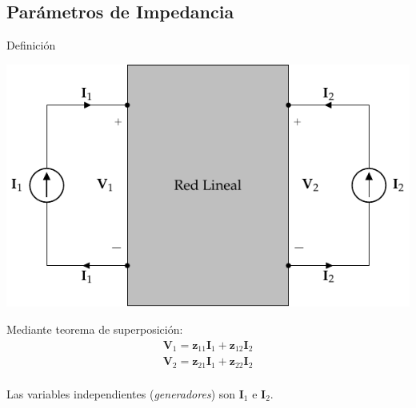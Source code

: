 \documentclass[xcolor={usenames,svgnames,dvipsnames}]{beamer}
\begin{document}
\subsection{Parámetros de Impedancia}
\label{sec:org39850c0}

\begin{frame}[label={sec:org4a5c1ec}]{Definición}
\begin{center}
\includegraphics[width=.9\linewidth]{../figs/cuadripolo_fuentes_corriente.pdf}
\end{center}

Mediante teorema de superposición:
\[
\begin{array}{l}
  \mathbf{V}_1 = \mathbf{z}_{11} \mathbf{I}_1 + \mathbf{z}_{12} \mathbf{I}_2\\
  \mathbf{V}_2 = \mathbf{z}_{21} \mathbf{I}_1 + \mathbf{z}_{22} \mathbf{I}_2\\
\end{array}
\]

Las variables independientes (\emph{generadores}) son \(\mathbf{I}_1\) e \(\mathbf{I}_2\).
\end{frame}
\end{document}
